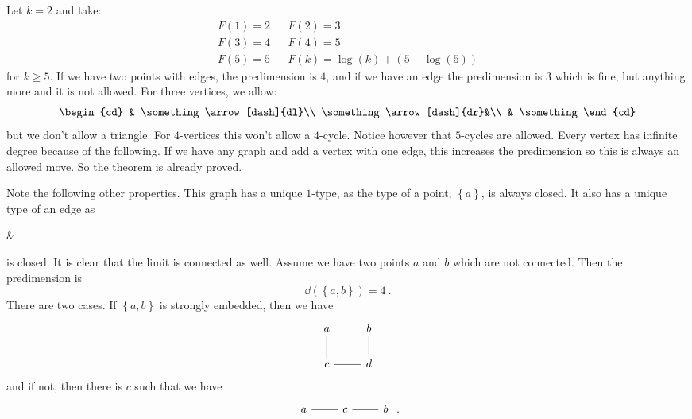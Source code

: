 \documentclass{amsart}
\begin{document}
\begin{exm}
Let $k = 2$ and take:
\begin{align}
F\left( 1 \right)  = 2 
&&
F\left( 2 \right) = 3
\\
F\left( 3 \right) = 4
&&
F\left( 4 \right) = 5
\\
F\left( 5 \right) = 5
&&
F\left( k \right)  = \log\left( k \right) + \left( 5- \log \left( 5 \right) \right)
\end{align}
for $k\geq 5$.
If we have two points with edges, the predimension is $4$, 
and if we have an edge the predimension is $3$ which is fine, but anything more and it is
not allowed. For three vertices, we allow:
\begin{equation}
\begin{cd}
& \something\arrow[dash]{dl}\\
\something\arrow[dash]{dr}&\\
& \something
\end{cd}
\end{equation}
but we don't allow a triangle. 
For $4$-vertices this won't allow a $4$-cycle.
Notice however that $5$-cycles are allowed.
Every vertex has infinite degree because of the following. 
If we have any graph and add a vertex with one
edge, this increases the predimension so this is always an allowed move.
So the theorem is already proved. 

Note the following other properties. 
This graph has a unique $1$-type, as the type of a point, $\left\{ a \right\}$, is always
closed. It also has a unique type of an edge as 
\begin{cd}
\something{}&\something
\end{cd}
is closed.
It is clear that the limit is connected as well. Assume we have two points $a$ and $b$
which are not connected. Then the predimension is
\begin{equation}
\dd\left( \left\{ a,b \right\} \right) = 4\ .
\end{equation}
There are two cases. If $\left\{ a,b \right\}$ is strongly embedded, then 
we have
\begin{equation}
\begin{tikzcd}
a\arrow[dash]{d}&
b\arrow[dash]{d}\\
c\arrow[dash]{r}&
d
\end{tikzcd}
\end{equation}
and if not, then there is $c$ such that we have
\begin{equation}
\begin{tikzcd}
a\arrow[dash]{r}&
c\arrow[dash]{r}&b
\end{tikzcd} \ .
\end{equation}
\end{exm}
\end{document}
